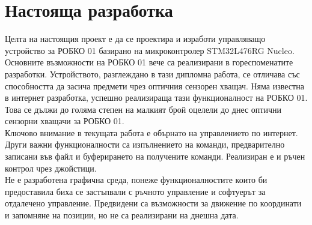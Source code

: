 \section{Настояща разработка}
Целта на настоящия проект е да се проектира и изработи управляващо устройство за РОБКО 01 базирано на микроконтролер STM32L476RG Nucleo. Основните възможности на РОБКО 01 вече са реализирани в гореспоменатите разработки. Устройството, разглеждано в тази дипломна работа, се отличава със способността да засича предмети чрез оптичния сензорен хващач. Няма известна в интернет разработка, успешно реализираща тази функционалност на РОБКО 01. Това се дължи до голяма степен на малкият брой оцелели до днес оптични сензорни хващачи за РОБКО 01.\\
\indent{}
Ключово внимание в текущата работа е обърнато на управлението по интернет. Други важни функционалности са изпълнението на команди, предварително записани във файл и буферирането на получените команди. Реализиран е и ръчен контрол чрез джойстици.\\
\indent{}
Не е разработена графична среда, понеже функционалностите които би предоставила биха се застъпвали с ръчното управление и софтуерът за отдалечено управление. Предвидени са възможности за движение по координати и запомняне на позиции, но не са реализирани на днешна дата.
